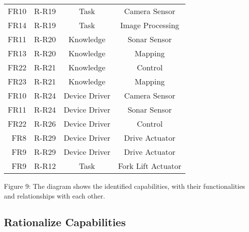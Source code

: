 {\begin{tabular}{| r | l | c | c |}
	FR10 					& R-R19 & Task & Camera Sensor\\
	FR14	 				& R-R19 & Task & Image Processing\\
	\hline
	FR11 					& R-R20 & Knowledge & Sonar Sensor\\
	FR13 					& R-R20 & Knowledge & Mapping\\ %
	FR22 					& R-R21 & Knowledge & Control\\
	FR23 					& R-R21 & Knowledge & Mapping\\
	\hline
	FR10 					& R-R24 & Device Driver & Camera Sensor\\
	FR11 					& R-R24 & Device Driver & Sonar Sensor\\
	FR22 					& R-R26 & Device Driver & Control\\
	FR8 					& R-R29 & Device Driver & Drive Actuator\\
	FR9 					& R-R29 & Device Driver & Drive Actuator\\
	FR9 					& R-R12 & Task & Fork Lift Actuator\\
	\hline
\end{tabular}
}



Figure 9: The diagram shows the identified capabilities, with their functionalities and relationships with each other.

\subsection{Rationalize Capabilities}
